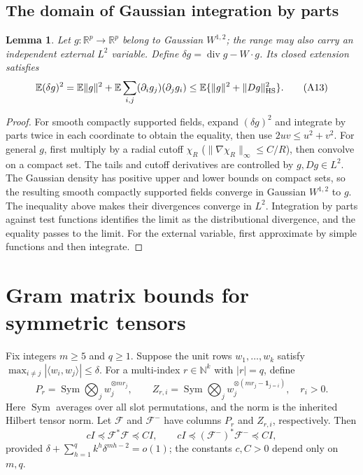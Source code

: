 \documentclass[a4paper]{tufte-handout}
\newtheorem{lemma}{Lemma}
\begin{document}
\begin{fullwidth}
\subsection{The domain of Gaussian integration by parts}
\begin{lemma}\label{an:sobolev}
Let $g:\mathbb R^p\to\mathbb R^p$ belong to Gaussian $W^{1,2}$; the range may also carry an independent external $L^2$ variable. Define
$\delta g=\operatorname{div}g-W\cdot g$. Its closed extension satisfies
\[
 \mathbb E(\delta g)^2
 =\mathbb E\|g\|^2+\mathbb E\sum_{i,j}(\partial_i g_j)(\partial_jg_i)
 \le\mathbb E\{\|g\|^2+\|Dg\|_{\rm HS}^2\}. \tag{A13}\label{an:divergence}
\]
\end{lemma}
\begin{proof}
For smooth compactly supported fields, expand $(\delta g)^2$ and integrate by parts twice in each coordinate to obtain the equality, then use $2uv\le u^2+v^2$.
For general $g$, first multiply by a radial cutoff $\chi_R$ ($\|\nabla\chi_R\|_\infty\le C/R$), then convolve on a compact set.
The tails and cutoff derivatives are controlled by $g,Dg\in L^2$. The Gaussian density has positive upper and lower bounds on compact sets,
so the resulting smooth compactly supported fields converge in Gaussian $W^{1,2}$ to $g$.
The inequality above makes their divergences converge in $L^2$. Integration by parts against test functions identifies the limit as the distributional divergence,
and the equality passes to the limit. For the external variable, first approximate by simple functions and then integrate.
\end{proof}


\section{Gram matrix bounds for symmetric tensors}\label{tg:section}
Fix integers $m\ge5$ and $q\ge1$. Suppose the unit rows $w_1,\ldots,w_k$ satisfy
$\max_{i\ne j}|\langle w_i,w_j\rangle|\le\delta$. For a multi-index $r\in\mathbb N^k$ with $|r|=q$, define
\[
 P_r=\operatorname{Sym}\bigotimes_jw_j^{\otimes mr_j},\qquad
 Z_{r,i}=\operatorname{Sym}\bigotimes_jw_j^{\otimes(mr_j-\mathbf1_{j=i})},\quad r_i>0.
\]
Here $\operatorname{Sym}$ averages over all slot permutations, and the norm is the inherited Hilbert tensor norm.
Let $\mathcal F$ and $\mathcal F^-$ have columns $P_r$ and $Z_{r,i}$, respectively. Then
\begin{equation}\label{tg:frame}
 cI\preceq\mathcal F^*\mathcal F\preceq CI,\qquad
 cI\preceq(\mathcal F^-)^*\mathcal F^-\preceq CI,
\end{equation}
provided $\delta+\sum_{h=1}^q k^h\delta^{mh-2}=o(1)$; the constants $c,C>0$ depend only on $m,q$.


\end{fullwidth}
\end{document}
